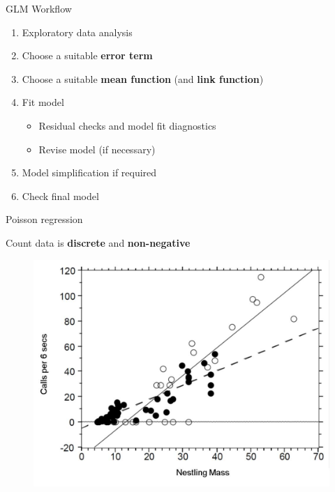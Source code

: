 \documentclass[pdf,handout]{beamer}
\begin{document}
\begin{frame}{GLM Workflow}

\begin{enumerate}\addtolength{\itemsep}{\baselineskip}
    \item<1-> Exploratory data analysis
    \item<2-> Choose a suitable \textbf{error term} 
    \item<3-> Choose a suitable \textbf{mean function} (and \textbf{link function})
    \item<4-> Fit model
    \begin{itemize}
    \item Residual checks and model fit diagnostics
    \item Revise model (if necessary)
    \end{itemize}
    \item<5-> Model simplification if required
    \item<6-> Check final model

\end{enumerate}

\end{frame}

\begin{frame}{Poisson regression}

Count data is \textbf{discrete} and \textbf{non-negative}

\begin{figure}
\includegraphics[width=.5\textwidth]{cuckooanalysis.png}
\end{figure}

\vspace{-.5cm}


\end{frame}
\end{document}
